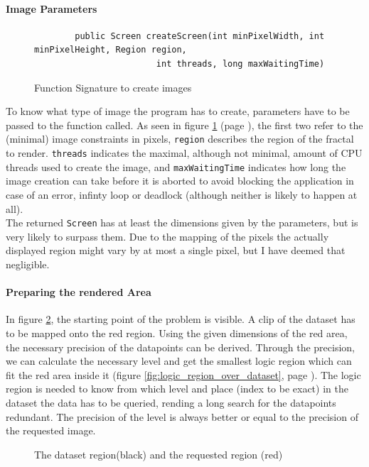 \documentclass[10pt,a4paper,titlepage]{article}
\begin{document}
	\paragraph{Image Parameters}
	\begin{figure}
		\centering
		\caption{Function Signature to create images}
		\label{fig:image_signature}
		\begin{verbatim}
		public Screen createScreen(int minPixelWidth, int minPixelHeight, Region region,
		                int threads, long maxWaitingTime)
		\end{verbatim}
	\end{figure}
	To know what type of image the program has to create, parameters have to be passed to the function called. As seen in figure \ref{fig:image_signature} (page \pageref{fig:image_signature}), the first two refer to the (minimal) image constraints in pixels, \verb|region| describes the region of the fractal to render. \verb|threads| indicates the maximal, although not minimal, amount of CPU threads used to create the image, and \verb|maxWaitingTime| indicates how long the image creation can take before it is aborted to avoid blocking the application in case of an error, infinty loop or deadlock (although neither is likely to happen at all).\\
	The returned \verb|Screen| has at least the dimensions given by the parameters, but is very likely to surpass them. Due to the mapping of the pixels the actually displayed region might vary by at most a single pixel, but I have deemed that negligible.	
	\paragraph{Preparing the rendered Area}
	In figure \ref{fig:region_over_dataset}, the starting point of the problem is visible. A clip of the dataset has to be mapped onto the red region. Using the given dimensions of the red area, the necessary precision of the datapoints can be derived. Through the precision, we can calculate the necessary level and get the smallest logic region which can fit the red area inside it (figure \ref{fig:logic_region_over_dataset}, page \pageref{fig:logic_region_over_dataset}). The logic region is needed to know from which level and place (index to be exact) in the dataset the data has to be queried, rending a long search for the datapoints redundant. The precision of the level is always better or equal to the precision of the requested image.	
	\begin{figure}
	\centering
	\caption{The dataset region(black) and the requested region (red)}
	\label{fig:region_over_dataset}
	\end{figure}
	
\end{document}
